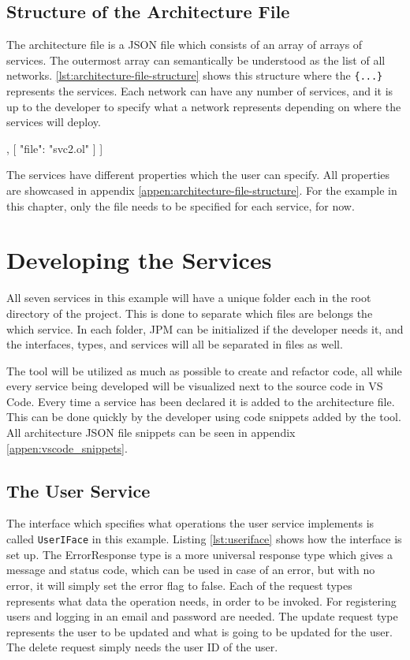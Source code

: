 \subsection{Structure of the Architecture File}
The architecture file is a JSON file which consists of an array of arrays of services. The outermost array can semantically be understood as the list of all networks.
\cref{lst:architecture-file-structure} shows this structure where the \texttt{\{...\}} represents the services. Each network can have any number of services, and it is up to the
developer to specify what a network represents depending on where the services will deploy.

\begin{jsonlisting}[][caption={Structure of the architecture JSON file showing two networks.}, label=lst:architecture-file-structure]
[
    [
        { "file": "svc1.ol" }
    ],
    [
        { "file": "svc2.ol" }
    ]
]
\end{jsonlisting}

The services have different properties which the user can specify. All properties are showcased in appendix \ref*{appen:architecture-file-structure}.
For the example in this chapter, only the file needs to be specified for each service, for now.

\section{Developing the Services}
All seven services in this example will have a unique folder each in the root directory of the project. This is done to separate which files are belongs the which service.
In each folder, JPM can be initialized if the developer needs it, and the interfaces, types, and services will all be separated in files as well.

The tool will be utilized as much as possible to create and refactor code, all while every service being developed will be visualized next to the source code in VS Code.
Every time a service has been declared it is added to the architecture file. This can be done quickly by the developer using code snippets added by the tool. All architecture JSON file snippets can be seen in appendix \ref*{appen:vscode_snippets}.
\subsection{The User Service}
The interface which specifies what operations the user service implements is called \texttt{UserIFace} in this example.
Listing \ref*{lst:useriface} shows how the interface is set up. The ErrorResponse type is a more universal response type which gives a message and status code, which can be used in case of an error, but with no error, it will simply set the error flag to false.
Each of the request types represents what data the operation needs, in order to be invoked. For registering users and logging in an email and password are needed. The update request type represents the user to be updated and what is going to be updated for the user. The delete request simply needs the user ID of the user.

